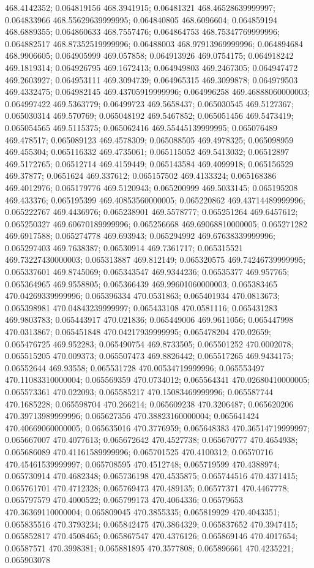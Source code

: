 468.4142352; 0.064819156 468.3941915; 0.06481321 468.46528639999997; 0.064833966 468.55629639999995; 0.064840805 468.6096604; 0.064859194 468.6889355; 0.064860633 468.7557476; 0.064864753 468.75347769999996; 0.064882517 468.87352519999996; 0.06488003 468.97913969999996; 0.064894684 468.9906605; 0.064905999 469.057858; 0.064913926 469.0754175; 0.064918242 469.1819314; 0.064926795 469.1672413; 0.064949803 469.2467305; 0.064947472 469.2603927; 0.064953111 469.3094739; 0.064965315 469.3099878; 0.064979503 469.4332475; 0.064982145 469.43705919999996; 0.064996258 469.46888060000003; 0.064997422 469.5363779; 0.06499723 469.5658437; 0.065030545 469.5127367; 0.065030314 469.570769; 0.065048192 469.5467852; 0.065051456 469.5473419; 0.065054565 469.5115375; 0.065062416 469.55445139999995; 0.065076489 469.478517; 0.065089123 469.4578309; 0.065088505 469.4978325; 0.065098959 469.455304; 0.065116332 469.4735061; 0.065115052 469.5413032; 0.06512897 469.5172765; 0.06512714 469.4159449; 0.065143584 469.4099918; 0.065156529 469.37877; 0.0651624 469.337612; 0.065157502 469.4133324; 0.065168386 469.4012976; 0.065179776 469.5120943; 0.065200999 469.5033145; 0.065195208 469.433376; 0.065195399 469.40853560000005; 0.065220862 469.43714489999996; 0.065222767 469.4436976; 0.065238901 469.5578777; 0.065251264 469.6457612; 0.065250327 469.60670189999996; 0.065256668 469.69068810000005; 0.065271282 469.6917588; 0.065274778 469.693943; 0.065294992 469.67638339999996; 0.065297403 469.7638387; 0.06530914 469.7361717; 0.065315521 469.73227430000003; 0.065313887 469.812149; 0.065320575 469.74246739999995; 0.065337601 469.8745069; 0.065343547 469.9344236; 0.06535377 469.957765; 0.065364965 469.9558805; 0.065366439 469.99601060000003; 0.065383465 470.04269339999996; 0.065396334 470.0531863; 0.065401934 470.0813673; 0.065398981 470.04843239999997; 0.065433108 470.0581116; 0.065431283 469.9803783; 0.065443917 470.021836; 0.065449006 469.9611056; 0.065447998 470.0313867; 0.065451848 470.04217939999995; 0.065478204 470.02659; 0.065476725 469.952283; 0.065490754 469.8733505; 0.065501252 470.0002078; 0.065515205 470.009373; 0.065507473 469.8826442; 0.065517265 469.9434175; 0.06552644 469.93558; 0.065531728 470.00534719999996; 0.065553497 470.11083310000004; 0.065569359 470.0734012; 0.065564341 470.02680410000005; 0.065573361 470.022093; 0.065585217 470.15083469999996; 0.065587744 470.1685228; 0.065598704 470.266214; 0.065609238 470.3206487; 0.065620206 470.39713989999996; 0.065627356 470.38823160000004; 0.065641424 470.40669060000005; 0.065635016 470.3776959; 0.065648383 470.36514719999997; 0.065667007 470.4077613; 0.065672642 470.4527738; 0.065670777 470.4654938; 0.065686089 470.41161589999996; 0.065701525 470.4100312; 0.06570716 470.45461539999997; 0.065708595 470.4512748; 0.065719599 470.4388974; 0.065730914 470.4682348; 0.065736198 470.4535875; 0.065744516 470.4371415; 0.065761701 470.4712328; 0.065769473 470.489135; 0.06577371 470.4467778; 0.065797579 470.4000522; 0.065799173 470.4064336; 0.06579653 470.36369110000004; 0.065809045 470.3855335; 0.065819929 470.4043351; 0.065835516 470.3793234; 0.065842475 470.3864329; 0.065837652 470.3947415; 0.065852817 470.4508465; 0.065867547 470.4376126; 0.065869146 470.4017654; 0.06587571 470.3998381; 0.065881895 470.3577808; 0.065896661 470.4235221; 0.065903078 
